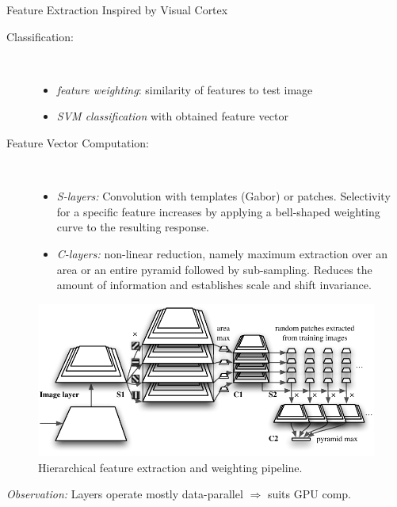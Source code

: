 \documentclass[final]{beamer}
\begin{document}
\begin{frame}{}
\begin{columns}[t]
\begin{column}{.48\linewidth}
\begin{block} {Feature Extraction Inspired by Visual Cortex}
\begin{description}
\item[Classification:]~
\begin{itemize}
	\item  \emph{feature weighting}: similarity of features to test image
	\item  \emph{SVM classification} with obtained feature vector
\end{itemize}

\item[Feature Vector Computation:]~ %
\begin{itemize}
\item
\emph{S-layers:} Convolution with templates (Gabor) or patches.
Selectivity for a specific feature increases by applying a bell-shaped weighting curve to the resulting response.
\item \emph{C-layers:} non-linear reduction, namely maximum
  extraction over an area or an entire pyramid followed by
  sub-sampling. Reduces the amount of information and establishes
 scale and shift invariance.\newline
\end{itemize}
\end{description}

\begin{figure}[tb]
\centering
\includegraphics[width=.7\linewidth]{images/pyramidp}
\caption{
  Hierarchical feature extraction and weighting pipeline.
}
\label{fig:pyramid}
\end{figure}
\emph{Observation:} Layers operate mostly data-parallel $\Rightarrow$ suits GPU comp.\newline
        \end{block}


\end{column}
\end{columns}
\end{frame}
\end{document}
